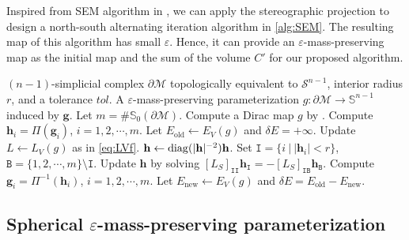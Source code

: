 \documentclass{article}
\begin{document}
Inspired from SEM algorithm in \cite{MHTL19}, we can apply the stereographic projection to design a north-south alternating iteration algorithm in \ref{alg:SEM}. The resulting map of this algorithm has small $\varepsilon$. Hence, it can provide an $\varepsilon$-mass-preserving map as the initial map and the sum of the volume $C'$ for our proposed algorithm.

\begin{algorithm}[H]
\caption{SEM for spherical mass-preserving parameterization}
\begin{algorithmic}[1] \label{alg:SEM}
    \REQUIRE $(n-1)$-simplicial complex $\partial \mathcal{M}$ topologically equivalent to $\mathcal{S}^{n-1}$, interior radius $r$, and a tolerance $tol$.
    \ENSURE A $\varepsilon$-mass-preserving parameterization $g:\partial \mathcal{M}\to \mathbb{S}^{n-1}$ induced by $\mathbf{g}$.
    \STATE Let $m = \#\mathbb{S}_0(\partial \mathcal{M})$.
    \STATE Compute a Dirac map $g$ by .
    \STATE Compute $\mathbf{h}_i = \Pi (\mathbf{g}_i)$, $i = 1,2,\cdots,m$.
    \STATE Let $E_{\text{old}} \gets E_V(g)$ and $\delta E = +\infty$.
    \STATE Update $L \gets L_V(g)$ as in \eqref{eq:LVf}.
    \STATE $\mathbf{h} \gets \mathrm{diag} (|\mathbf{h}|^{-2}) \mathbf{h}$.
    \STATE Set $\mathtt{I} = \{i~|~ |\mathbf{h}_i| < r\}$, $\mathtt{B} = \{1,2,\cdots,m\}\setminus \mathtt{I}$.
    \STATE Update $\mathbf{h}$ by solving $[ L_S ]_{\mathtt{I}\mathtt{I}} \mathbf{h}_{\mathtt{I}} = -[ L_S ]_{\mathtt{I}\mathtt{B}} \mathbf{h}_{\mathtt{B}}$.
    \STATE Compute $\mathbf{g}_i = \Pi^{-1}(\mathbf{h}_i)$, $i = 1,2,\cdots, m$.
    \STATE Let $E_{\text{new}} \gets E_V(g)$ and $\delta E = E_{\text{old}} - E_{\text{new}}$.
    \ENDWHILE
\end{algorithmic}
\end{algorithm}


\subsection{Spherical $\varepsilon$-mass-preserving parameterization}
\end{document}
